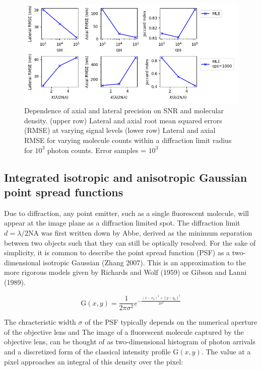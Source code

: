 \documentclass{ucetd}
\begin{document}
\begin{figure}
\begin{center}
\includegraphics[width=16cm]{PSF3D.png}
\end{center}
\caption{Dependence of axial and lateral precision on SNR and molecular density. (upper row) Lateral and axial root mean squared errors (RMSE) at varying signal levels (lower row) Lateral and axial RMSE for varying molecule counts within a diffraction limit radius for $10^{3}$ photon counts. Error samples = $10^{3}$}
\end{figure}




\subsection{Integrated isotropic and anisotropic Gaussian point spread functions}


Due to diffraction, any point emitter, such as a single fluorescent molecule, will appear at the image plane as a diffraction limited spot. The diffraction limit $d = \lambda / 2\mathrm{NA}$ was first written down by Abbe, derived as the minimum separation between two objects such that they can still be optically resolved. For the sake of simplicity, it is common to describe the point spread function (PSF) as a two-dimensional isotropic Gaussian (Zhang 2007). This is an approximation to the more rigorous models given by Richards and Wolf (1959) or Gibson and Lanni (1989). 

\begin{equation*}
\mathrm{G}(x,y) = \frac{1}{2\pi\sigma^{2}}e^{-\frac{(x-x_{0})^{2}+(y-y_{0})^{2}}{2\sigma^{2}}}
\end{equation*}

The chracteristic width $\sigma$ of the PSF typically depends on the numerical aperture of the objective lens and The image of a fluorescent molecule captured by the objective lens, can be thought of as two-dimensional histogram of photon arrivals and a discretized form of the classical intensity profile $\mathrm{G}(x,y)$. The value at a pixel approaches an integral of this density over the pixel:
\end{document}
